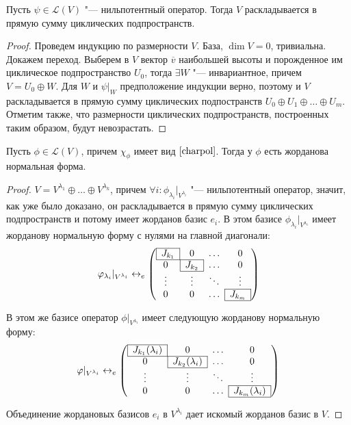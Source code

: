\begin{corollary}
	Пусть $\psi \in \mathcal{L}(V)$ "--- нильпотентный оператор. Тогда $V$ раскладывается в прямую сумму циклических подпространств.
\end{corollary}

\begin{proof}
	Проведем индукцию по размерности $V$. База, $\dim{V} = 0$, тривиальна. Докажем переход. Выберем в $V$ вектор $\overline{v}$ наибольшей высоты и порожденное им циклическое подпространство $U_0$, тогда $\exists W$ "--- инвариантное, причем $V = U_0 \oplus W$. Для $W$ и $\psi|_W$ предположение индукции верно, поэтому и $V$ раскладывается в прямую сумму циклических подпостранств $U_0 \oplus U_1 \oplus \dots \oplus U_m$. Отметим также, что размерности циклических подпространств, построенных таким образом, будут невозрастать.
\end{proof}

\begin{theorem}
	Пусть $\phi \in \mathcal{L}(V)$, причем $\chi_\phi$ имеет вид $\eqref*{charpol}$. Тогда у $\phi$ есть жорданова нормальная форма.
\end{theorem}

\begin{proof}
	$V = V^{\lambda_1} \oplus \dots \oplus V^{\lambda_k}$, причем $\forall i: \phi_{\lambda_i}|_{V^{\lambda_i}}$ "--- нильпотентный оператор, значит, как уже было доказано, он раскладывается в прямую сумму циклических подпространств и потому имеет жорданов базис $e_i$. В этом базисе $\phi_{\lambda_i}|_{V^{\lambda_i}}$ имеет жорданову нормальную форму с нулями на главной диагонали:
	\[\phi_{\lambda_i}|_{V^{\lambda_i}} \leftrightarrow_e \left(\begin{array}{@{}cccc@{}}
		\cline{1-1}
		\multicolumn{1}{|c|}{J_{k_1}} & 0 & \dots & 0\\
		\cline{1-2}
		0 & \multicolumn{1}{|c|}{J_{k_2}} & \dots & 0\\
		\cline{2-2}
		\vdots & \vdots & \ddots & \vdots\\
		\cline{4-4}
		0 & 0 & \dots & \multicolumn{1}{|c|}{J_{k_m}}\\
		\cline{4-4}
	\end{array}\right)\]
	
	В этом же базисе оператор $\phi|_{V^{\lambda_i}}$ имеет следующую жорданову нормальную форму:
	\[\phi|_{V^{\lambda_i}} \leftrightarrow_e \left(\begin{array}{@{}cccc@{}}
		\cline{1-1}
		\multicolumn{1}{|c|}{J_{k_1}(\lambda_i)} & 0 & \dots & 0\\
		\cline{1-2}
		0 & \multicolumn{1}{|c|}{J_{k_2}(\lambda_i)} & \dots & 0\\
		\cline{2-2}
		\vdots & \vdots & \ddots & \vdots\\
		\cline{4-4}
		0 & 0 & \dots & \multicolumn{1}{|c|}{J_{k_m}(\lambda_i)}\\
		\cline{4-4}
	\end{array}\right)\]
	
	Объединение жордановых базисов $e_i$ в $V^{\lambda_i}$ дает искомый жорданов базис в $V$.
\end{proof}

